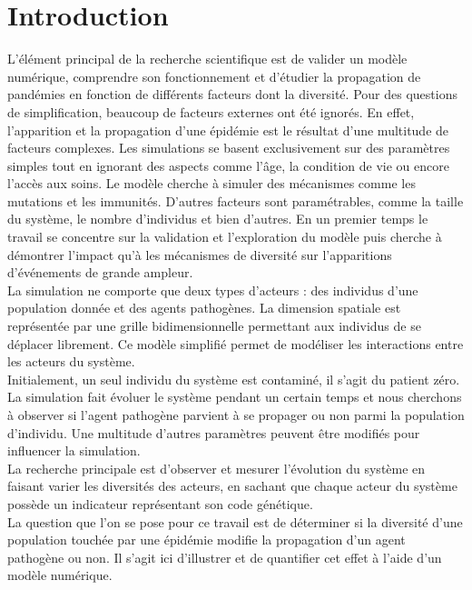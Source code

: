 \chapter{Introduction} \label{ch:introduction}

L'élément principal de la recherche scientifique est de valider un modèle numérique, comprendre son fonctionnement et d'étudier la propagation de pandémies en fonction de différents facteurs dont la diversité. Pour des questions de simplification, beaucoup de facteurs externes ont été ignorés. En effet, l'apparition et la propagation d'une épidémie est le résultat d'une multitude de facteurs complexes. Les simulations se basent exclusivement sur des paramètres simples tout en ignorant des aspects comme l'âge, la condition de vie ou encore l'accès aux soins. Le modèle cherche à simuler des mécanismes comme les mutations et les immunités. D'autres facteurs sont paramétrables, comme la taille du système, le nombre d'individus et bien d'autres. En un premier temps le travail se concentre sur la validation et l'exploration du modèle puis cherche à démontrer l'impact qu'à les mécanismes de diversité sur l'apparitions d'événements de grande ampleur.\\

La simulation ne comporte que deux types d'acteurs : des individus d'une population donnée et des agents pathogènes. La dimension spatiale est représentée par une grille bidimensionnelle permettant aux individus de se déplacer librement. Ce modèle simplifié permet de modéliser les interactions entre les acteurs du système.\\

Initialement, un seul individu du système est contaminé, il s'agit du patient zéro. La simulation fait évoluer le système pendant un certain temps et nous cherchons à observer si l'agent pathogène parvient à se propager ou non parmi la population d'individu. Une multitude d'autres paramètres peuvent être modifiés pour influencer la simulation.\\

La recherche principale est d'observer et mesurer l'évolution du système en faisant varier les diversités des acteurs, en sachant que chaque acteur du système possède un indicateur représentant son code génétique.\\

La question que l'on se pose pour ce travail est de déterminer si la diversité d'une population touchée par une épidémie modifie la propagation d'un agent pathogène ou non. Il s'agit ici d'illustrer et de quantifier cet effet à l'aide d'un modèle numérique.